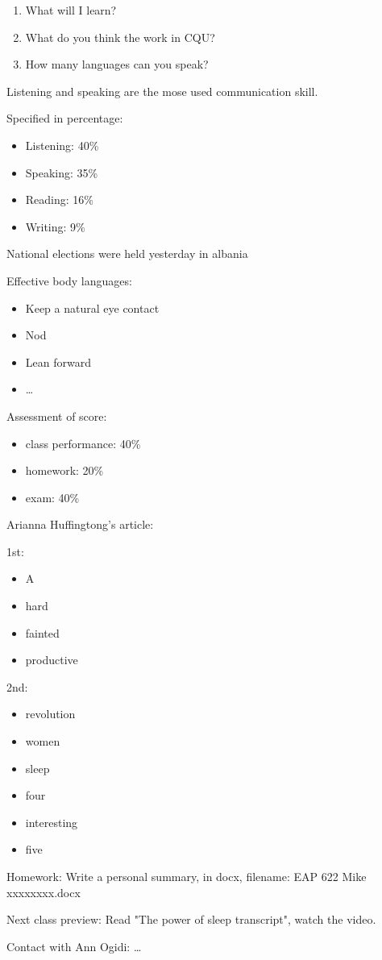 \begin{question}
    \begin{enumerate}
        \item What will I learn?
        \item What do you think the work in CQU?
        \item How many languages can you speak?
    \end{enumerate}
\end{question}
\begin{notation}
    Listening and speaking are the mose used communication skill.

    Specified in percentage:
    \begin{itemize}
        \item Listening: 40\%
        \item Speaking: 35\%
        \item Reading: 16\%
        \item Writing: 9\%
    \end{itemize}
\end{notation}
\begin{eg}
    National elections were held yesterday in albania
\end{eg}
\begin{notation}
    Effective body languages:
    \begin{itemize}
        \item Keep a natural eye contact
        \item Nod
        \item Lean forward
        \item \ldots 
    \end{itemize}
\end{notation}
\begin{notation}
    Assessment of score:
    \begin{itemize}
        \item class performance: 40\%
        \item homework: 20\%
        \item exam: 40\%
    \end{itemize}
\end{notation}
Arianna Huffingtong's article:
\begin{sol}
    1st:
    \begin{itemize}
        \item A
        \item hard
        \item fainted
        \item productive
    \end{itemize}
    2nd: 
    \begin{itemize}
        \item revolution
        \item women
        \item sleep
        \item four
        \item interesting
        \item five
    \end{itemize}
\end{sol}
Homework: Write a personal summary, in docx, filename: EAP 622 Mike xxxxxxxx.docx

Next class preview: Read "The power of sleep transcript", watch the video.

Contact with Ann Ogidi: \ldots 
